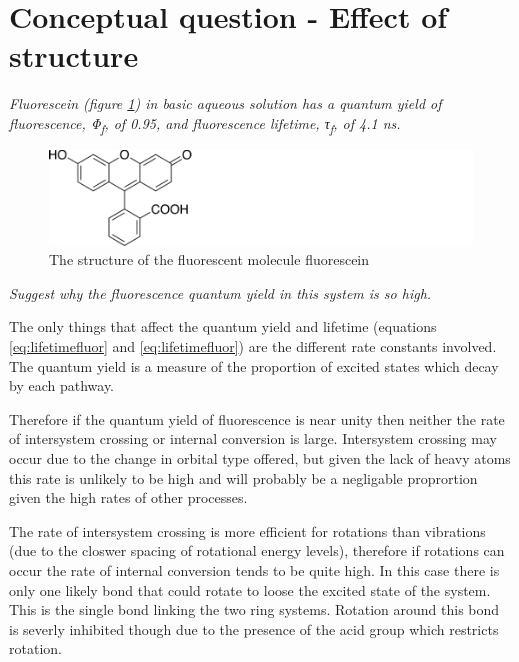 \documentclass[
]{book}
\begin{document}
\hypertarget{sec:structure}{%
\section{Conceptual question - Effect of structure}\label{sec:structure}}

\emph{Fluorescein (figure \ref{fig:fluorescein}) in basic aqueous solution has a quantum yield of fluorescence, Φ\textsubscript{f}, of 0.95, and fluorescence lifetime, τ\textsubscript{f}, of 4.1 ns.}

\begin{figure}

{\centering \includegraphics[width=0.7\linewidth]{images/fluorescein} 

}

\caption{The structure of the fluorescent molecule fluorescein}\label{fig:fluorescein}
\end{figure}

\emph{Suggest why the fluorescence quantum yield in this system is so high.}

The only things that affect the quantum yield and lifetime (equations \eqref{eq:lifetimefluor} and \eqref{eq:lifetimefluor}) are the different rate constants involved. The quantum yield is a measure of the proportion of excited states which decay by each pathway.

Therefore if the quantum yield of fluorescence is near unity then neither the rate of intersystem crossing or internal conversion is large. Intersystem crossing may occur due to the change in orbital type offered, but given the lack of heavy atoms this rate is unlikely to be high and will probably be a negligable proprortion given the high rates of other processes.

The rate of intersystem crossing is more efficient for rotations than vibrations (due to the closwer spacing of rotational energy levels), therefore if rotations can occur the rate of internal conversion tends to be quite high. In this case there is only one likely bond that could rotate to loose the excited state of the system. This is the single bond linking the two ring systems. Rotation around this bond is severly inhibited though due to the presence of the acid group which restricts rotation.
\end{document}
